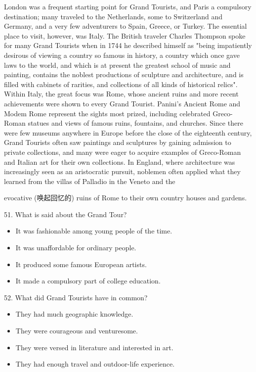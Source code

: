 \documentclass[UTF8,11pt]{ctexart}
\begin{document}
London was a frequent starting point for Grand Tourists, and Paris a compulsory destination; many traveled to the Netherlands, some to Switzerland and Germany, and a very few adventurers to Spain, Greece, or Turkey. The essential place to visit, however, was Italy. The British traveler Charles Thompson spoke for many Grand Tourists when in 1744 he described himself as "being impatiently desirous of viewing a country so famous in history, a country which once gave laws to the world, and which is at present the greatest school of music and painting, contains the noblest productions of sculpture and architecture, and is filled with cabinets of rarities, and collections of all kinds of historical relics". Within Italy, the great focus was Rome, whose ancient ruins and more recent achievements were shown to every Grand Tourist. Panini's Ancient Rome and Modem Rome represent the sights most prized, including celebrated Greco-Roman statues and views of famous ruins, fountains, and churches. Since there were few museums anywhere in Europe before the close of the eighteenth century, Grand Tourists often saw paintings and sculptures by gaining admission to private collections, and many were eager to acquire examples of Greco-Roman and Italian art for their own collections. In England, where architecture was increasingly seen as an aristocratic pursuit, noblemen often applied what they learned from the villas of Palladio in the Veneto and the


evocative (唤起回忆的) ruins of Rome to their own country houses and gardens.


51. What is said about the Grand Tour?


\begin{itemize}[leftmargin=2em,itemsep=.2em,topsep=.4em]\item[A.] It was fashionable among young people of the time.
\item[B.] It was unaffordable for ordinary people.
\item[C.] It produced some famous European artists.
\item[D.] It made a compulsory part of college education.
\end{itemize}

52. What did Grand Tourists have in common?


\begin{itemize}[leftmargin=2em,itemsep=.2em,topsep=.4em]\item[A.] They had much geographic knowledge.
\item[B.] They were courageous and venturesome.
\item[C.] They were versed in literature and interested in art.
\item[D.] They had enough travel and outdoor-life experience.
\end{itemize}
\end{document}
